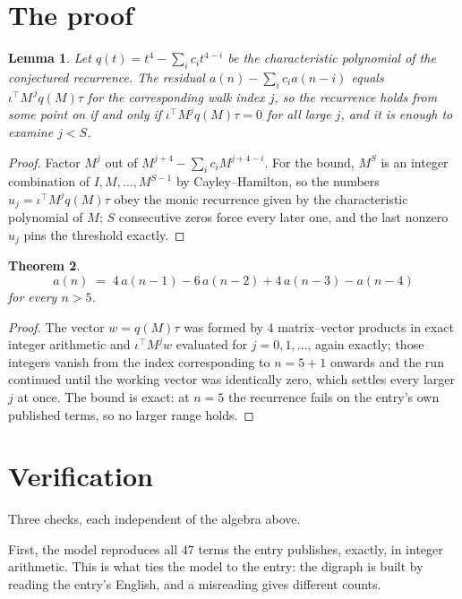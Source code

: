 \documentclass[11pt,a4paper]{article}
\theoremstyle{plain}
\newtheorem{theorem}{Theorem}
\newtheorem{lemma}[theorem]{Lemma}
\theoremstyle{definition}
\begin{document}
\section{The proof}

\begin{lemma}\label{lem:crit}
Let $q(t)=t^{4}-\sum_i c_it^{4-i}$ be the characteristic polynomial of the
conjectured recurrence. The residual $a(n)-\sum_ic_ia(n-i)$ equals
$\iota^{\!\top}M^{\,j}q(M)\tau$ for the corresponding walk index $j$, so the recurrence
holds from some point on if and only if $\iota^{\!\top}M^{j}q(M)\tau=0$ for all large $j$,
and it is enough to examine $j<S$.
\end{lemma}

\begin{proof}
Factor $M^{j}$ out of $M^{j+4}-\sum_ic_iM^{j+4-i}$. For the bound, $M^{S}$
is an integer combination of $I,M,\dots,M^{S-1}$ by Cayley--Hamilton, so the numbers
$u_j=\iota^{\!\top}M^{j}q(M)\tau$ obey the monic recurrence given by the characteristic
polynomial of $M$; $S$ consecutive zeros force every later one, and the last nonzero $u_j$
pins the threshold exactly.
\end{proof}

\begin{theorem}
\[
a(n)\;=\;4\,a(n-1) - 6\,a(n-2) + 4\,a(n-3) - a(n-4)
\]
for every $n>5$.
\end{theorem}

\begin{proof}
The vector $w=q(M)\tau$ was formed by $4$ matrix--vector products in exact integer
arithmetic and $\iota^{\!\top}M^{j}w$ evaluated for $j=0,1,\dots$, again exactly; those
integers vanish from the index corresponding to $n=5+1$ onwards and the run continued
until the working vector was identically zero, which settles every larger $j$ at once. The bound is exact: at $n=5$ the recurrence fails on the entry's own published terms, so no larger range holds.
\end{proof}

\section{Verification}

Three checks, each independent of the algebra above.

First, the model reproduces all $47$ terms the entry publishes, exactly, in integer
arithmetic. This is what ties the model to the entry: the digraph is built by reading the
entry's English, and a misreading gives different counts.
\end{document}
